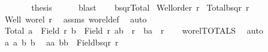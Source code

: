\begin{isabellebody}
\ \ \ \ \isamarkupfalse%
\ \isamarkupfalse%
\ {\isacharquery}{\kern0pt}thesis\ \isamarkupfalse%
\ {}\ {}\ \isamarkupfalse%
\ blast\isanewline
\ \ \isamarkupfalse%
\isanewline
{}\isamarkupfalse%
%
\endisatagproof
{\isafoldproof}%
%
\isadelimproof
\isanewline
%
\endisadelimproof
\isanewline
{}\isamarkupfalse%
\ bsqr{\isacharunderscore}{\kern0pt}Total{\isacharcolon}{\kern0pt}\isanewline
{}\ {\isachardoublequoteopen}Well{\isacharunderscore}{\kern0pt}order\ r{\isachardoublequoteclose}\isanewline
{}\ {\isachardoublequoteopen}Total{\isacharparenleft}{\kern0pt}bsqr\ r{\isacharparenright}{\kern0pt}{\isachardoublequoteclose}\isanewline
%
\isadelimproof
%
\endisadelimproof
%
\isatagproof
{}\isamarkupfalse%
{\isacharminus}{\kern0pt}\isanewline
\ \ \isanewline
\ \ \isamarkupfalse%
\ Well{\isacharcolon}{\kern0pt}\ {\isachardoublequoteopen}wo{\isacharunderscore}{\kern0pt}rel\ r{\isachardoublequoteclose}\ \isamarkupfalse%
\ assms\ wo{\isacharunderscore}{\kern0pt}rel{\isacharunderscore}{\kern0pt}def\ \isamarkupfalse%
\ auto\isanewline
\ \ \isamarkupfalse%
\ Total{\isacharcolon}{\kern0pt}\ {\isachardoublequoteopen}{\isasymforall}a\ {\isasymin}\ Field\ r{\isachardot}{\kern0pt}\ {\isasymforall}b\ {\isasymin}\ Field\ r{\isachardot}{\kern0pt}\ {\isacharparenleft}{\kern0pt}a{\isacharcomma}{\kern0pt}b{\isacharparenright}{\kern0pt}\ {\isasymin}\ r\ {\isasymor}\ {\isacharparenleft}{\kern0pt}b{\isacharcomma}{\kern0pt}a{\isacharparenright}{\kern0pt}\ {\isasymin}\ r{\isachardoublequoteclose}\isanewline
\ \ \isamarkupfalse%
\ wo{\isacharunderscore}{\kern0pt}rel{\isachardot}{\kern0pt}TOTALS\ \isamarkupfalse%
\ auto\isanewline
\ \ \isanewline
\ \ \isacommand{{\isacharbraceleft}{\kern0pt}}\isamarkupfalse%
\isamarkupfalse%
\ a{}\ a{}\ b{}\ b{}\ \isamarkupfalse%
\ {\isachardoublequoteopen}{\isacharbraceleft}{\kern0pt}{\isacharparenleft}{\kern0pt}a{}{\isacharcomma}{\kern0pt}a{}{\isacharparenright}{\kern0pt}{\isacharcomma}{\kern0pt}\ {\isacharparenleft}{\kern0pt}b{}{\isacharcomma}{\kern0pt}b{}{\isacharparenright}{\kern0pt}{\isacharbraceright}{\kern0pt}\ {\isasymle}\ Field{\isacharparenleft}{\kern0pt}bsqr\ r{\isacharparenright}{\kern0pt}{\isachardoublequoteclose}\isanewline

\end{isabellebody}
